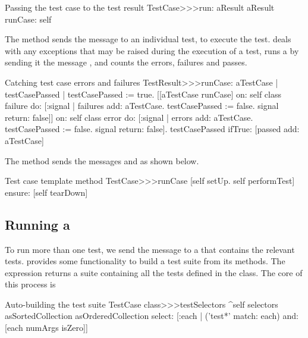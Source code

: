 \documentclass[a4paper,10pt,twoside]{book}
\begin{document}
\begin{method}[testcaserun:]{Passing the test case to the test result}
TestCase>>>run: aResult
	aResult runCase: self
\end{method}
The method  sends
the message  to an individual test, to execute the test.
 deals with 
any exceptions that may be raised during the
execution of a test, runs a  by sending it the
message , and counts the errors, failures
and passes.
\begin{method}[testresultruncase]{Catching test case errors and failures}
TestResult>>>runCase: aTestCase
	| testCasePassed |
	testCasePassed := true.
	[[aTestCase runCase] 
			on: self class failure
			do: 
				[:signal | 
				failures add: aTestCase.
				testCasePassed := false.
				signal return: false]]
					on: self class error
					do:
						[:signal |
						errors add: aTestCase.
						testCasePassed := false.
						signal return: false].
	testCasePassed ifTrue: [passed add: aTestCase]
\end{method}

The method  sends the messages
 and  as shown below.
\begin{method}[testcaseruncase]{Test case template method}
TestCase>>>runCase
	[self setUp.
	self performTest] ensure: [self tearDown]
\end{method}

\subsection{Running a }

To run more than one test, we send the message
 to a  that contains the relevant tests. 
 provides some functionality to build a test suite from
its methods.  The expression  returns a suite containing all the tests defined in the  class.
The core of this process is
\begin{method}[testcasetestselectors]{Auto-building the test suite}
TestCase class>>>testSelectors 
	^self selectors asSortedCollection asOrderedCollection select: [:each | 
		('test*' match: each) and: [each numArgs isZero]]
\end{method}
\end{document}
